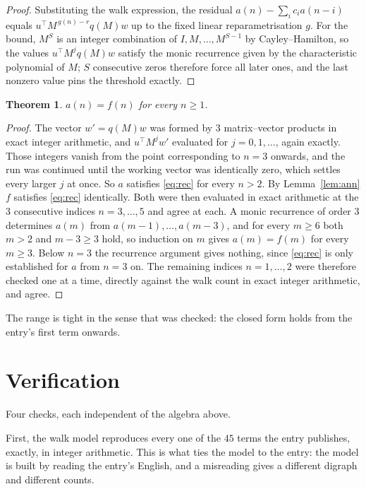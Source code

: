 \documentclass[11pt,a4paper]{article}
\theoremstyle{plain}
\newtheorem{theorem}{Theorem}
\theoremstyle{definition}
\begin{document}
\begin{proof}
Substituting the walk expression, the residual $a(n)-\sum_ic_ia(n-i)$ equals
$u^{\!\top}M^{\,g(n)-r}q(M)w$ up to the fixed linear reparametrisation $g$. For the bound,
$M^{S}$ is an integer combination of $I,M,\dots,M^{S-1}$ by Cayley--Hamilton, so the values
$u^{\!\top}M^{j}q(M)w$ satisfy the monic recurrence given by the characteristic polynomial of
$M$; $S$ consecutive zeros therefore force all later ones, and the last nonzero value pins the
threshold exactly.
\end{proof}

\begin{theorem}
$a(n)=f(n)$ for every $n\ge1$.
\end{theorem}

\begin{proof}
The vector $w'=q(M)w$ was formed by $3$ matrix--vector products in exact integer
arithmetic, and $u^{\!\top}M^{j}w'$ evaluated for $j=0,1,\dots$, again exactly. Those integers
vanish from the point corresponding to $n=3$ onwards, and the run was continued until the
working vector was identically zero, which settles every larger $j$ at once. So $a$ satisfies
\eqref{eq:rec} for every $n>2$. By Lemma~\ref{lem:ann} $f$ satisfies \eqref{eq:rec}
identically. Both were then evaluated in exact arithmetic at the $3$ consecutive indices
$n=3,\dots,5$ and agree at each. A monic recurrence of order $3$
determines $a(m)$ from $a(m-1),\dots,a(m-3)$, and for every $m\ge6$ both
$m>2$ and $m-3\ge3$ hold, so induction on $m$ gives $a(m)=f(m)$ for every
$m\ge3$.
Below $n=3$ the recurrence argument gives nothing, since \eqref{eq:rec} is only
established for $a$ from $n=3$ on. The remaining indices $n=1,\dots,2$ were
therefore checked one at a time, directly against the walk count in exact integer arithmetic,
and agree.
\end{proof}

The range is tight in the sense that was checked: the closed form holds from the entry's first term onwards.

\section{Verification}

Four checks, each independent of the algebra above.

First, the walk model reproduces every one of the $45$ terms the entry publishes,
exactly, in integer arithmetic. This is what ties the model to the entry: the model is built
by reading the entry's English, and a misreading gives a different digraph and different
counts.
\end{document}
